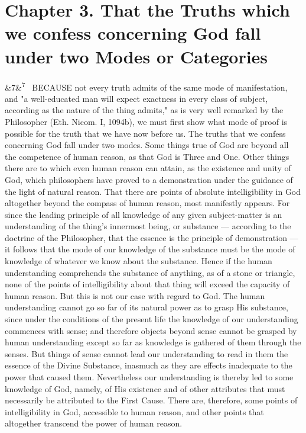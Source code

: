 \documentclass[12pt]{article}
\newcommand{\para}[1][]{\par\noindent\ifx&#1&\else\textsuperscript{\footnotesize #1}~\fi}
\begin{document}
\section*{Chapter 3. That the Truths which we confess concerning God fall under two Modes or Categories}

\para[7] BECAUSE not every truth admits of the same mode of manifestation, and "a well-educated man will expect exactness in every class of subject, according as the nature of the thing admits," as is very well remarked by the Philosopher (Eth. Nicom. I, 1094b), we must first show what mode of proof is possible for the truth that we have now before us. The truths that we confess concerning God fall under two modes. Some things true of God are beyond all the competence of human reason, as that God is Three and One. Other things there are to which even human reason can attain, as the existence and unity of God, which philosophers have proved to a demonstration under the guidance of the light of natural reason. That there are points of absolute intelligibility in God altogether beyond the compass of human reason, most manifestly appears. For since the leading principle of all knowledge of any given subject-matter is an understanding of the thing's innermost being, or substance --- according to the doctrine of the Philosopher, that the essence is the principle of demonstration --- it follows that the mode of our knowledge of the substance must be the mode of knowledge of whatever we know about the substance. Hence if the human understanding comprehends the substance of anything, as of a stone or triangle, none of the points of intelligibility about that thing will exceed the capacity of human reason. But this is not our case with regard to God. The human understanding cannot go so far of its natural power as to grasp His substance, since under the conditions of the present life the knowledge of our understanding commences with sense; and therefore objects beyond sense cannot be grasped by human understanding except so far as knowledge is gathered of them through the senses. But things of sense cannot lead our understanding to read in them the essence of the Divine Substance, inasmuch as they are effects inadequate to the power that caused them. Nevertheless our understanding is thereby led to some knowledge of God, namely, of His existence and of other attributes that must necessarily be attributed to the First Cause. There are, therefore, some points of intelligibility in God, accessible to human reason, and other points that altogether transcend the power of human reason.
\end{document}
